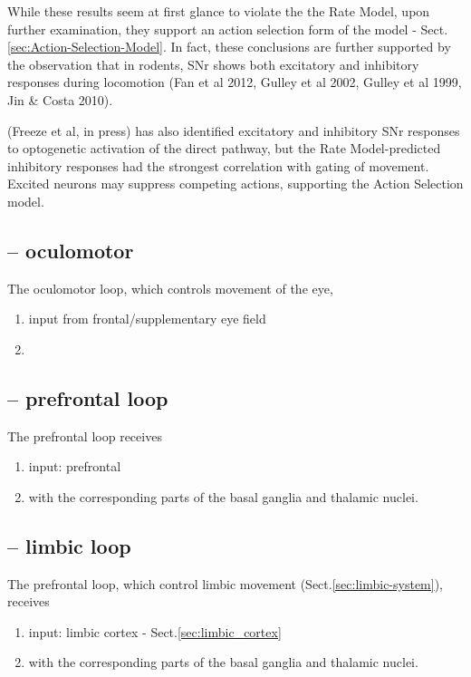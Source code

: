 While these results seem at first glance to violate the the Rate Model, upon
further examination, they support an action selection form of the model -
Sect.\ref{sec:Action-Selection-Model}. In fact, these conclusions are further
supported by the observation that in rodents, SNr shows both excitatory and
inhibitory responses during locomotion (Fan et al 2012, Gulley et al 2002,
Gulley et al 1999, Jin \& Costa 2010).

(Freeze et al, in press) has also identified excitatory and inhibitory SNr
responses to optogenetic activation of the direct pathway, but the Rate
Model-predicted inhibitory responses had the strongest correlation with gating
of movement. Excited neurons may suppress competing actions, supporting the
Action Selection model.




\subsection{-- oculomotor}
\label{sec:oculomotor-loop}

The oculomotor loop, which controls movement of the eye,
\begin{enumerate}
  \item input from frontal/supplementary eye field

  \item 
\end{enumerate} 

\subsection{-- prefrontal loop}
\label{sec:prefrontal-loop}

The prefrontal loop receives 
\begin{enumerate}
  \item  input:  prefrontal

  \item with the corresponding parts of the basal ganglia and
thalamic nuclei.
\end{enumerate}

\subsection{-- limbic loop}
\label{sec:limbic-loop}

The prefrontal loop, which control limbic movement
(Sect.\ref{sec:limbic-system}), receives
\begin{enumerate}
  \item  input:  limbic cortex - Sect.\ref{sec:limbic_cortex}

  \item with the corresponding parts of the basal ganglia and
thalamic nuclei.

\end{enumerate}


